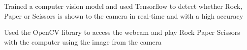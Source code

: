 \documentclass[]{plushcv}
\begin{document}
\begin{minipage}[t]{0.70\textwidth}


\begin{tightemize}
\item Trained a computer vision model and used Tensorflow to detect whether Rock, Paper or Scissors is shown to the camera in real-time and with a high accuracy
\item Used the OpenCV library to access the webcam and play Rock Paper Scissors with the computer using the image from the camera
\end{tightemize}


%
%

\end{minipage} 
\end{document}

